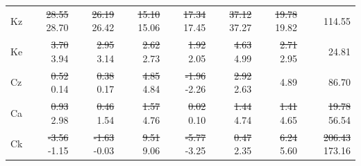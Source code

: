 \documentclass[pdflatex,sn-chicago]{sn-jnl}%
\makeatletter
\theoremstyle{plain}
\theoremstyle{definition}
\theoremstyle{remark}
\theoremstyle{definition}
\providecommand{\DIFaddtex}[1]{{\protect\color{blue}#1}} %
\providecommand{\DIFdeltex}[1]{{\protect\color{red}\sout{#1}}} %
\providecommand{\DIFaddFL}[1]{\DIFadd{#1}} %
\providecommand{\DIFdelFL}[1]{\DIFdel{#1}} %
\providecommand{\DIFaddbeginFL}{} %
\providecommand{\DIFaddendFL}{} %
\providecommand{\DIFdelbeginFL}{} %
\providecommand{\DIFdelendFL}{} %
\providecommand{\DIFadd}[1]{\texorpdfstring{\DIFaddtex{#1}}{#1}} %
\providecommand{\DIFdel}[1]{\texorpdfstring{\DIFdeltex{#1}}{}} %
\let\sout@orig\sout %
\renewcommand{\sout}[1]{\ifmmode\text{\sout@orig{\ensuremath{#1}}}\else\sout@orig{#1}\fi} %
\makeatother
\begin{document}
\begin{table}[!htbp]
\begin{tabular}{lrrrrrrr}
Kz & \DIFdelbeginFL \DIFdelFL{28.55 }\DIFdelendFL \DIFaddbeginFL \DIFaddFL{28.70 }\DIFaddendFL & \DIFdelbeginFL \DIFdelFL{26.19 }\DIFdelendFL \DIFaddbeginFL \DIFaddFL{26.42 }\DIFaddendFL & \DIFdelbeginFL \DIFdelFL{15.10 }\DIFdelendFL \DIFaddbeginFL \DIFaddFL{15.06 }\DIFaddendFL & \DIFdelbeginFL \DIFdelFL{17.34 }\DIFdelendFL \DIFaddbeginFL \DIFaddFL{17.45 }\DIFaddendFL & \DIFdelbeginFL \DIFdelFL{37.12 }\DIFdelendFL \DIFaddbeginFL \DIFaddFL{37.27 }\DIFaddendFL & \DIFdelbeginFL \DIFdelFL{19.78 }\DIFdelendFL \DIFaddbeginFL \DIFaddFL{19.82 }\DIFaddendFL & 114.55 \\
Ke & \DIFdelbeginFL \DIFdelFL{3.70 }\DIFdelendFL \DIFaddbeginFL \DIFaddFL{3.94 }\DIFaddendFL & \DIFdelbeginFL \DIFdelFL{2.95 }\DIFdelendFL \DIFaddbeginFL \DIFaddFL{3.14 }\DIFaddendFL & \DIFdelbeginFL \DIFdelFL{2.62 }\DIFdelendFL \DIFaddbeginFL \DIFaddFL{2.73 }\DIFaddendFL & \DIFdelbeginFL \DIFdelFL{1.92 }\DIFdelendFL \DIFaddbeginFL \DIFaddFL{2.05 }\DIFaddendFL & \DIFdelbeginFL \DIFdelFL{4.63 }\DIFdelendFL \DIFaddbeginFL \DIFaddFL{4.99 }\DIFaddendFL & \DIFdelbeginFL \DIFdelFL{2.71 }\DIFdelendFL \DIFaddbeginFL \DIFaddFL{2.95 }\DIFaddendFL & 24.81 \\
Cz & \DIFdelbeginFL \DIFdelFL{0.52 }\DIFdelendFL \DIFaddbeginFL \DIFaddFL{0.14 }\DIFaddendFL & \DIFdelbeginFL \DIFdelFL{0.38 }\DIFdelendFL \DIFaddbeginFL \DIFaddFL{0.17 }\DIFaddendFL & \DIFdelbeginFL \DIFdelFL{4.85 }\DIFdelendFL \DIFaddbeginFL \DIFaddFL{4.84 }\DIFaddendFL & \DIFdelbeginFL \DIFdelFL{-1.96 }\DIFdelendFL \DIFaddbeginFL \DIFaddFL{-2.26 }\DIFaddendFL & \DIFdelbeginFL \DIFdelFL{2.92 }\DIFdelendFL \DIFaddbeginFL \DIFaddFL{2.63 }\DIFaddendFL & 4.89 & 86.70 \\
Ca & \DIFdelbeginFL \DIFdelFL{0.93 }\DIFdelendFL \DIFaddbeginFL \DIFaddFL{2.98 }\DIFaddendFL & \DIFdelbeginFL \DIFdelFL{0.46 }\DIFdelendFL \DIFaddbeginFL \DIFaddFL{1.54 }\DIFaddendFL & \DIFdelbeginFL \DIFdelFL{1.57 }\DIFdelendFL \DIFaddbeginFL \DIFaddFL{4.76 }\DIFaddendFL & \DIFdelbeginFL \DIFdelFL{0.02 }\DIFdelendFL \DIFaddbeginFL \DIFaddFL{0.10 }\DIFaddendFL & \DIFdelbeginFL \DIFdelFL{1.44 }\DIFdelendFL \DIFaddbeginFL \DIFaddFL{4.74 }\DIFaddendFL & \DIFdelbeginFL \DIFdelFL{1.41 }\DIFdelendFL \DIFaddbeginFL \DIFaddFL{4.65 }\DIFaddendFL & \DIFdelbeginFL \DIFdelFL{19.78 }\DIFdelendFL \DIFaddbeginFL \DIFaddFL{56.54 }\DIFaddendFL \\
Ck & \DIFdelbeginFL \DIFdelFL{-3.56 }\DIFdelendFL \DIFaddbeginFL \DIFaddFL{-1.15 }\DIFaddendFL & \DIFdelbeginFL \DIFdelFL{-1.63 }\DIFdelendFL \DIFaddbeginFL \DIFaddFL{-0.03 }\DIFaddendFL & \DIFdelbeginFL \DIFdelFL{9.51 }\DIFdelendFL \DIFaddbeginFL \DIFaddFL{9.06 }\DIFaddendFL & \DIFdelbeginFL \DIFdelFL{-5.77 }\DIFdelendFL \DIFaddbeginFL \DIFaddFL{-3.25 }\DIFaddendFL & \DIFdelbeginFL \DIFdelFL{0.47 }\DIFdelendFL \DIFaddbeginFL \DIFaddFL{2.35 }\DIFaddendFL & \DIFdelbeginFL \DIFdelFL{6.24 }\DIFdelendFL \DIFaddbeginFL \DIFaddFL{5.60 }\DIFaddendFL & \DIFdelbeginFL \DIFdelFL{206.43 }\DIFdelendFL \DIFaddbeginFL \DIFaddFL{173.16 }\DIFaddendFL \\

\end{tabular}
\end{table}
\end{document}
